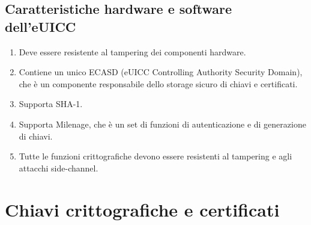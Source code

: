 \documentclass[10pt, twoside, openany]{book}
\begin{document}
\subsection{Caratteristiche hardware e software dell'eUICC}
\begin{enumerate}[itemsep=0pt]
\item Deve essere resistente al tampering dei componenti hardware.
\item Contiene un unico ECASD (eUICC Controlling Authority Security Domain), che è un componente responsabile dello storage sicuro di chiavi e certificati.
\item Supporta SHA-1.
\item Supporta Milenage, che è un set di funzioni di autenticazione e di generazione di chiavi.
\item Tutte le funzioni crittografiche devono essere resistenti al tampering e agli attacchi side-channel.
\end{enumerate}

\section{Chiavi crittografiche e certificati}
\end{document}
